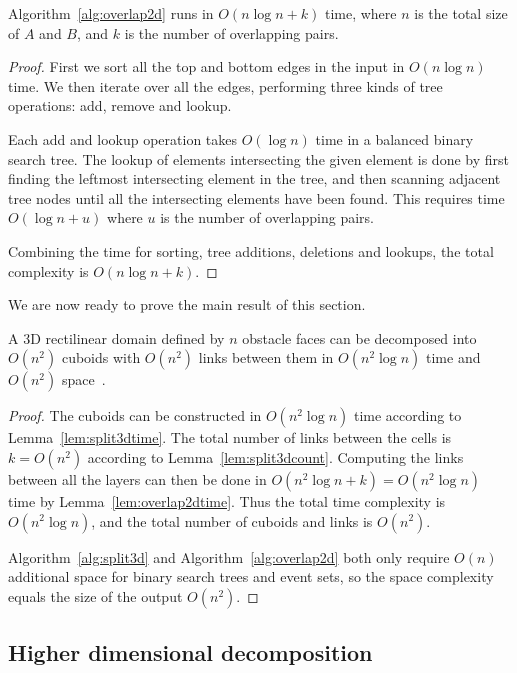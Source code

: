 \documentclass[english,gradu]{tktltiki2018}
\begin{document}
\begin{lem}\label{lem:overlap2dtime}Algorithm~\ref{alg:overlap2d} runs in $O(n\log n + k)$ time, where $n$ is the total size of $A$ and $B$, and $k$ is the number of overlapping pairs.\end{lem}
\begin{proof}
First we sort all the top and bottom edges in the input in $O(n\log n)$ time.
We then iterate over all the edges, performing three kinds of tree operations: add, remove and lookup.

Each add and lookup operation takes $O(\log n)$ time in a balanced binary search tree.
The lookup of elements intersecting the given element is done by first finding the leftmost intersecting element in the tree, and then scanning adjacent tree nodes until all the intersecting elements have been found.
This requires time $O(\log n+u)$ where $u$ is the number of overlapping pairs.

Combining the time for sorting, tree additions, deletions and lookups, the total complexity is $O(n\log n + k)$.
\end{proof}

We are now ready to prove the main result of this section.

\begin{theo}\label{theo:split3dtime}A 3D rectilinear domain defined by $n$ obstacle faces can be decomposed into $O(n^2)$ cuboids with $O(n^2)$ links between them in $O(n^2\log n)$ time and $O(n^2)$ space~\cite{restricted}.\end{theo}
\begin{proof}
The cuboids can be constructed in $O(n^2\log n)$ time according to Lemma~\ref{lem:split3dtime}.
The total number of links between the cells is $k=O(n^2)$ according to Lemma~\ref{lem:split3dcount}.
Computing the links between all the layers can then be done in $O(n^2\log n+k)=O(n^2\log n)$ time by Lemma~\ref{lem:overlap2dtime}.
Thus the total time complexity is $O(n^2\log n)$, and the total number of cuboids and links is $O(n^2)$.

Algorithm~\ref{alg:split3d} and Algorithm~\ref{alg:overlap2d} both only require $O(n)$ additional space for binary search trees and event sets, so the space complexity equals the size of the output $O(n^2)$.
\end{proof}



\subsection{Higher dimensional decomposition}\label{sec:splitdd}
\end{document}
